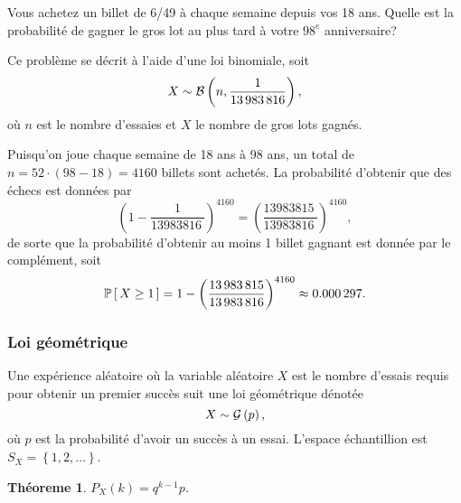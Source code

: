 \documentclass[11pt]{article}
\renewcommand\P[1]{%
	\ensuremath{%
		\mathbb{P}\left[\,#1\,\right]%
	}%
}%
\newcommand\Bin[2]{%
	\ensuremath{%
		\mathcal{B}\left(#1,#2\right)%
	}%
}%
\newcommand\Geo[1]{%
	\ensuremath{%
		\mathcal{G}\left(#1\right)%
	}%
}%
\newtheorem{theoreme}{Théoreme}[section]
\begin{document}
\vspace{-5mm}
\begin{exemple}
	Vous achetez un billet de 6/49 à chaque semaine depuis vos 18 ans. Quelle
	est la probabilité de gagner le gros lot au plus tard à votre $98^e$
	anniversaire?
	
	Ce problème se décrit à l'aide d'une loi binomiale, soit
	\begin{equation*}
		X\sim\Bin{n}{\frac{1}{\SI{13983816}{}}},
	\end{equation*}
	où $n$ est le nombre d'essaies et $X$ le nombre de gros lots gagnés.
	\vspace{-1mm}
\end{exemple}\pagebreak
\addtocounter{exemple}{-1}
\begin{exemple}[suite]
	Puisqu'on joue chaque semaine de 18 ans à 98 ans, un total de
	$n=52\cdot(98-18)=4160$ billets sont achetés. La probabilité d'obtenir que
	des échecs est données par
	\begin{equation*}
		\left(1-\frac{1}{\SI{13983816}{}}\right)^{4160}=
		\left(\frac{\SI{13983815}{}}{\SI{13983816}{}}\right)^{4160},
	\end{equation*}
	de sorte que la probabilité d'obtenir au moins 1 billet gagnant est donnée
	par le complément, soit
	\begin{equation*}
		\P{X\geq 1}
		=1-\left(\frac{\SI{13983815}{}}{\SI{13983816}{}}\right)^{4160}
		\approx\SI{0.000297}{}.
	\end{equation*}
\end{exemple}

\subsubsection{Loi géométrique}
Une expérience aléatoire où la variable aléatoire $X$ est le nombre d'essais
requis pour obtenir un premier succès suit une loi géométrique dénotée
\begin{equation*}
	X\sim\Geo{p},
\end{equation*}
où $p$ est la probabilité d'avoir un succès à un essai. L'espace échantillion
est $S_X=\left\{1,2,\dots\right\}$.

\begin{theoreme}
	$P_X(k)=q^{k-1}p$.
\end{theoreme}
\end{document}
